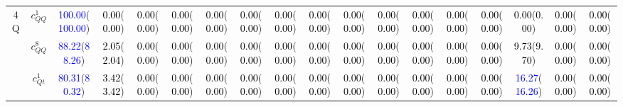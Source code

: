 \documentclass{article}
\begin{document}
\begin{landscape}
\begin{table}[H]
\begin{tabular}{|c|c|c|c|c|c|c|c|c|c|c|c|c|c|c|c|c|c|}
\multirow{5}{*}{4Q}
 & $c_{QQ}^{1}$ & \textcolor{blue}{100.00}(\textcolor{blue}{100.00}) & \textcolor{black}{0.00}(\textcolor{black}{0.00}) & \textcolor{black}{0.00}(\textcolor{black}{0.00}) & \textcolor{black}{0.00}(\textcolor{black}{0.00}) & \textcolor{black}{0.00}(\textcolor{black}{0.00}) & \textcolor{black}{0.00}(\textcolor{black}{0.00}) & \textcolor{black}{0.00}(\textcolor{black}{0.00}) & \textcolor{black}{0.00}(\textcolor{black}{0.00}) & \textcolor{black}{0.00}(\textcolor{black}{0.00}) & \textcolor{black}{0.00}(\textcolor{black}{0.00}) & \textcolor{black}{0.00}(\textcolor{black}{0.00}) & \textcolor{black}{0.00}(\textcolor{black}{0.00}) & \textcolor{black}{0.00}(\textcolor{black}{0.00}) & \textcolor{black}{0.00}(\textcolor{black}{0.00}) & \textcolor{black}{0.00}(\textcolor{black}{0.00}) & \textcolor{black}{0.00}(\textcolor{black}{0.00})\\ \cline{2-18}
 & $c_{QQ}^{8}$ & \textcolor{blue}{88.22}(\textcolor{blue}{88.26}) & \textcolor{black}{2.05}(\textcolor{black}{2.04}) & \textcolor{black}{0.00}(\textcolor{black}{0.00}) & \textcolor{black}{0.00}(\textcolor{black}{0.00}) & \textcolor{black}{0.00}(\textcolor{black}{0.00}) & \textcolor{black}{0.00}(\textcolor{black}{0.00}) & \textcolor{black}{0.00}(\textcolor{black}{0.00}) & \textcolor{black}{0.00}(\textcolor{black}{0.00}) & \textcolor{black}{0.00}(\textcolor{black}{0.00}) & \textcolor{black}{0.00}(\textcolor{black}{0.00}) & \textcolor{black}{0.00}(\textcolor{black}{0.00}) & \textcolor{black}{0.00}(\textcolor{black}{0.00}) & \textcolor{black}{0.00}(\textcolor{black}{0.00}) & \textcolor{black}{9.73}(\textcolor{black}{9.70}) & \textcolor{black}{0.00}(\textcolor{black}{0.00}) & \textcolor{black}{0.00}(\textcolor{black}{0.00})\\ \cline{2-18}
 & $c_{Qt}^{1}$ & \textcolor{blue}{80.31}(\textcolor{blue}{80.32}) & \textcolor{black}{3.42}(\textcolor{black}{3.42}) & \textcolor{black}{0.00}(\textcolor{black}{0.00}) & \textcolor{black}{0.00}(\textcolor{black}{0.00}) & \textcolor{black}{0.00}(\textcolor{black}{0.00}) & \textcolor{black}{0.00}(\textcolor{black}{0.00}) & \textcolor{black}{0.00}(\textcolor{black}{0.00}) & \textcolor{black}{0.00}(\textcolor{black}{0.00}) & \textcolor{black}{0.00}(\textcolor{black}{0.00}) & \textcolor{black}{0.00}(\textcolor{black}{0.00}) & \textcolor{black}{0.00}(\textcolor{black}{0.00}) & \textcolor{black}{0.00}(\textcolor{black}{0.00}) & \textcolor{black}{0.00}(\textcolor{black}{0.00}) & \textcolor{blue}{16.27}(\textcolor{blue}{16.26}) & \textcolor{black}{0.00}(\textcolor{black}{0.00}) & \textcolor{black}{0.00}(\textcolor{black}{0.00})\\ \cline{2-18}

\end{tabular}
\end{table}
\end{landscape}
\end{document}
